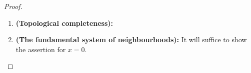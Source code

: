                 \begin{proof}
                    \noindent
                    \begin{enumerate}
                        \item \textbf{(Topological completeness):}
                        \item \textbf{(The fundamental system of neighbourhoods):} It will suffice to show the assertion for $x = 0$.
                    \end{enumerate}
                \end{proof}